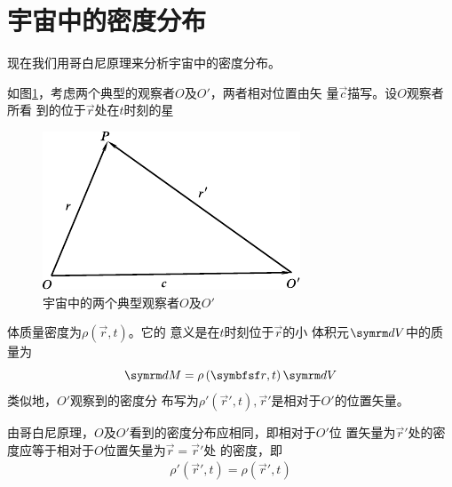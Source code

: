 \section{宇宙中的密度分布}\label{sec:05.02}

现在我们用哥白尼原理来分析宇宙中的密度分布。

如图\ref{fig:05.01}，考虑两个典型的观察者$ O $及$ O' $，两者相对位置由矢
量$ \vec{c} $描写。设$ O $观察者所看
到的位于$ \vec{r} $处在$ t $时刻的星
\begin{figure}
  \centering
  \includegraphics{figure/fig05.01}
  \caption{宇宙中的两个典型观察者$ O $及$ O' $}
  \label{fig:05.01}
\end{figure}
体质量密度为$ \rho \left( \vec{r} , t \right) $。它的
意义是在$ t $时刻位于$ \vec{r} $的小
体积元$ \dif V $中的质量为
{\setlength\mathindent{3em}
\begin{equation*}
  \dif M = \rho \left( \vec{r} , t \right) \dif V
\end{equation*}}
类似地，$ O' $观察到的密度分
布写为$ \rho ' \left( \vec{r} ' , t \right) , \vec{r} ' $是相对于$ O' $的位置矢量。

由哥白尼原理，$ O $及$ O' $看到的密度分布应相同，即相对于$ O' $位
置矢量为$ \vec{r} ' $处的密度应等于相对于$ O $位置矢量为$ \vec{r} = \vec{r} ' $处
的密度，即\vspace{-1.5em}
\begin{align}\label{eqn:05.02.01}
  \rho ' \left( \vec{r} ' , t \right) = \rho \left( \vec{r} ' , t \right)
\end{align}

